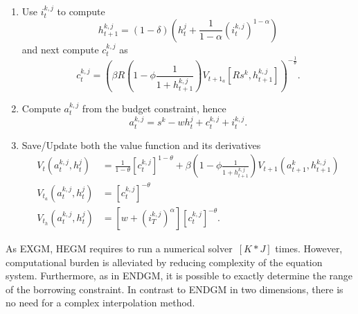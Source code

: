 \documentclass[a4paper,12pt]{article}%
\begin{document}
\begin{enumerate}
\begin{enumerate}
\item Use $i_{t}^{k,j}$ to compute
\[
h_{t+1}^{k,j}=\left(  1-\delta\right)  \left(  h_{t}^{j}+\frac{1}{1-\alpha
}\left(  i_{t}^{k,j}\right)  ^{1-\alpha}\right)
\]
and next compute $c_{t}^{k,j}$ as
\[
c_{t}^{k,j}=\left(  \beta R\left(  1-\phi\frac{1}{1+h_{t+1}^{k,j}}\right)
\text{$V_{t+1_{a}}$}\left[  Rs^{k},h_{t+1}^{k,j}\right]  \right)  ^{-\frac
{1}{\theta}}.
\]


\item Compute $a_{t}^{k,j}$ from the budget constraint, hence
\[
a_{t}^{k,j}=s^{k}-wh_{t}^{j}+c_{t}^{k,j}+i_{t}^{k,j}.
\]


\item Save/Update both the value function and its derivatives%
\begin{align*}
V_{t}\left(  a_{t}^{k,j},h_{t}^{j}\right)   &  =\frac{1}{1-\theta}\left[
c_{t}^{k,j}\right]  ^{1-\theta}+\beta\left(  1-\phi\frac{1}{1+h_{t+1}^{k,j}%
}\right)  V_{t+1}(a_{t+1}^{k},h_{t+1}^{k,j})\\
\text{$V_{t_{a}}$}\left(  a_{t}^{k,j},h_{t}^{j}\right)   &  =\left[
c_{t}^{k,j}\right]  ^{-\theta}\\
\text{$V_{t_{h}}$}\left(  a_{t}^{k,j},h_{t}^{j}\right)   &  =\left[  w+\left(
i_{T}^{k,j}\right)  ^{\alpha}\right]  \left[  c_{t}^{k,j}\right]  ^{-\theta}.
\end{align*}

\end{enumerate}
\end{enumerate}

As EXGM, HEGM requires to run a numerical solver~$\left[  K\ast J\right]  $
times. However, computational burden is alleviated by reducing complexity of
the equation system. Furthermore, as in ENDGM, it is possible to exactly
determine the range of the borrowing constraint. In contrast to ENDGM in two
dimensions, there is no need for a complex interpolation method.
\end{document}
